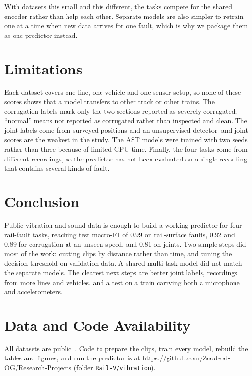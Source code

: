 \documentclass[conference]{IEEEtran}
\begin{document}
With datasets this small and this different, the tasks compete for the shared encoder rather
than help each other. Separate models are also simpler to retrain one at a time when new data
arrives for one fault, which is why we package them as one predictor instead.

\section{Limitations}

Each dataset covers one line, one vehicle and one sensor setup, so none of these scores shows
that a model transfers to other track or other trains. The corrugation labels mark only the two
sections reported as severely corrugated; ``normal'' means not reported as corrugated rather than
inspected and clean. The joint labels come from surveyed positions and an unsupervised
detector, and joint scores are the weakest in the study. The AST models were trained with two
seeds rather than three because of limited GPU time. Finally, the four tasks come from different
recordings, so the predictor has not been evaluated on a single recording that contains several
kinds of fault.

\section{Conclusion}

Public vibration and sound data is enough to build a working predictor for four rail-fault
tasks, reaching test macro-F1 of 0.99 on rail-surface faults, 0.92 and 0.89 for corrugation at an
unseen speed, and 0.81 on joints. Two simple steps did most of the work: cutting clips by
distance rather than time, and tuning the decision threshold on validation data. A shared
multi-task model did not match the separate models. The clearest next steps are better joint
labels, recordings from more lines and vehicles, and a test on a train carrying both a
microphone and accelerometers.

\section*{Data and Code Availability}
\label{sec:availability}
All datasets are public~\cite{shafique2021,upmcorrugation,ma2026railvivid}. Code to prepare the
clips, train every model, rebuild the tables and figures, and run the predictor is at
\url{https://github.com/Zcodeod-OG/Research-Projects} (folder \texttt{Rail-V/vibration}).



\end{document}
